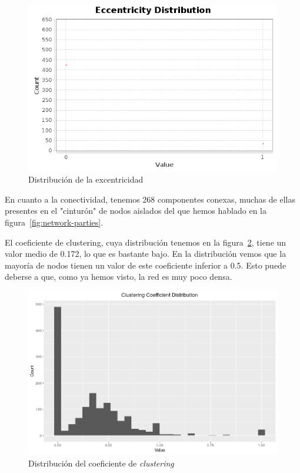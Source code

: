 \begin{figure}
    \includegraphics[width=\textwidth]{images/plots/eccentricity-distribution.png}
    \caption{Distribución de la excentricidad}
    \label{fig:eccentricity-distribution}
\end{figure}

\newpage

En cuanto a la conectividad, tenemos 268 componentes conexas, muchas de ellas
presentes en el "cinturón" de nodos aislados del que hemos hablado en la
figura~\ref{fig:network-parties}.

El coeficiente de clustering, cuya distribución tenemos en la
figura~\ref{fig:clustering-distribution}, tiene un valor medio de 0.172, lo que
es bastante bajo. En la distribución vemos que la mayoría de nodos tienen un
valor de este coeficiente inferior a 0.5. Esto puede deberse a que, como ya
hemos visto, la red es muy poco densa.

\begin{figure}
    \includegraphics[width=\textwidth]{images/plots/clustering-coefficient-distribution.png}
    \caption{Distribución del coeficiente de \textit{clustering}}
    \label{fig:clustering-distribution}
\end{figure}
